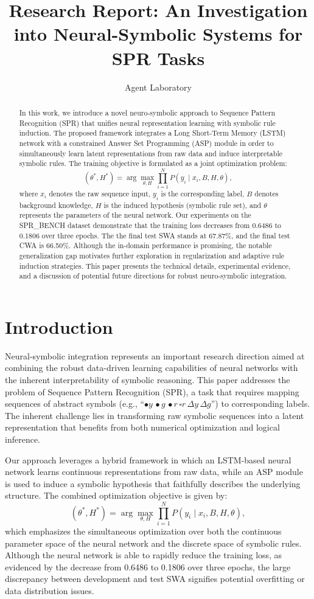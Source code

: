 \documentclass{article}
\title{Research Report: An Investigation into Neural-Symbolic Systems for SPR Tasks}
\author{Agent Laboratory}
\date{}
\begin{document}
\maketitle

\begin{abstract}
In this work, we introduce a novel neuro‐symbolic approach to Sequence Pattern Recognition (SPR) that unifies neural representation learning with symbolic rule induction. The proposed framework integrates a Long Short-Term Memory (LSTM) network with a constrained Answer Set Programming (ASP) module in order to simultaneously learn latent representations from raw data and induce interpretable symbolic rules. The training objective is formulated as a joint optimization problem:
\[
(\theta^*, H^*) = \arg\max_{\theta,H} \prod_{i=1}^{N} P(y_i \mid x_i, B, H, \theta),
\]
where \(x_i\) denotes the raw sequence input, \(y_i\) is the corresponding label, \(B\) denotes background knowledge, \(H\) is the induced hypothesis (symbolic rule set), and \(\theta\) represents the parameters of the neural network. Our experiments on the SPR\_BENCH dataset demonstrate that the training loss decreases from 0.6486 to 0.1806 over three epochs. The the final test SWA stands at 67.87\%, and the final test CWA is 66.50\%. Although the in-domain performance is promising, the notable generalization gap motivates further exploration in regularization and adaptive rule induction strategies. This paper presents the technical details, experimental evidence, and a discussion of potential future directions for robust neuro‐symbolic integration.
\end{abstract}

\section{Introduction}
Neural-symbolic integration represents an important research direction aimed at combining the robust data-driven learning capabilities of neural networks with the inherent interpretability of symbolic reasoning. This paper addresses the problem of Sequence Pattern Recognition (SPR), a task that requires mapping sequences of abstract symbols (e.g., ``\(\bullet y \, \bullet g \, \bullet r \, \square r \, \Delta y \, \Delta g\)'') to corresponding labels. The inherent challenge lies in transforming raw symbolic sequences into a latent representation that benefits from both numerical optimization and logical inference.

Our approach leverages a hybrid framework in which an LSTM-based neural network learns continuous representations from raw data, while an ASP module is used to induce a symbolic hypothesis that faithfully describes the underlying structure. The combined optimization objective is given by:
\[
(\theta^*, H^*) = \arg\max_{\theta, H} \prod_{i=1}^{N} P(y_i \mid x_i, B, H, \theta),
\]
which emphasizes the simultaneous optimization over both the continuous parameter space of the neural network and the discrete space of symbolic rules. Although the neural network is able to rapidly reduce the training loss, as evidenced by the decrease from 0.6486 to 0.1806 over three epochs, the large discrepancy between development and test SWA signifies potential overfitting or data distribution issues.
\end{document}
